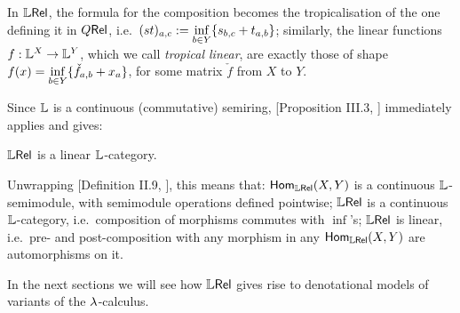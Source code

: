 \begin{remark}
 In $\mathbb{L} \mathsf{Rel}$, the formula for the composition becomes the tropicalisation of the one defining it in $Q \mathsf{Rel}$, i.e.\ $(st)_{a,c}:=\inf\limits_{b\in Y}\{s_{b,c}+t_{a,b}\}$;
 similarly, the linear functions $f:\mathbb{L}^X\to \mathbb{L}^Y$, which we call \emph{tropical linear}, are exactly those of shape $f(x)=\inf\limits_{b\in Y} \{\check f_{a,b}+x_a\}$, for some matrix $\check f$ from $X$ to $Y$.
\end{remark}

Since $\mathbb{L}$ is a continuous (commutative) semiring, [Proposition III.3, \cite{Manzo2013}] immediately applies and gives:

\begin{fact}
 $\mathbb{L} \mathsf{Rel}$ is a linear $\mathbb{L}$-category.
\end{fact}

Unwrapping [Definition II.9, \cite{Manzo2013}], this means that:
$\mathsf{Hom}_{\mathbb{L} \mathsf{Rel}}(X,Y)$ is a continuous $\mathbb{L}$-semimodule, with semimodule operations defined pointwise;
$\mathbb{L} \mathsf{Rel}$ is a continuous $\mathbb{L}$-category, i.e.\ composition of morphisms commutes with $\inf$'s;
$\mathbb{L} \mathsf{Rel}$ is linear, i.e.\ pre- and post-composition with any morphism in any $\mathsf{Hom}_{\mathbb{L} \mathsf{Rel}}(X,Y)$ are automorphisms on it.

In the next sections we will see how $\mathbb{L} \mathsf{Rel}$ gives rise to denotational models of variants of the $\lambda$-calculus.
